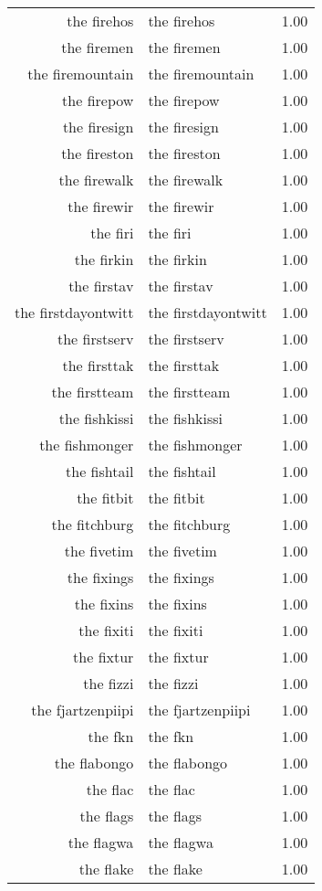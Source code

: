 \begin{table}[ht]
\begin{tabular}{rlr}
  the firehos & the firehos & 1.00 \\ 
  the firemen & the firemen & 1.00 \\ 
  the firemountain & the firemountain & 1.00 \\ 
  the firepow & the firepow & 1.00 \\ 
  the firesign & the firesign & 1.00 \\ 
  the fireston & the fireston & 1.00 \\ 
  the firewalk & the firewalk & 1.00 \\ 
  the firewir & the firewir & 1.00 \\ 
  the firi & the firi & 1.00 \\ 
  the firkin & the firkin & 1.00 \\ 
  the firstav & the firstav & 1.00 \\ 
  the firstdayontwitt & the firstdayontwitt & 1.00 \\ 
  the firstserv & the firstserv & 1.00 \\ 
  the firsttak & the firsttak & 1.00 \\ 
  the firstteam & the firstteam & 1.00 \\ 
  the fishkissi & the fishkissi & 1.00 \\ 
  the fishmonger & the fishmonger & 1.00 \\ 
  the fishtail & the fishtail & 1.00 \\ 
  the fitbit & the fitbit & 1.00 \\ 
  the fitchburg & the fitchburg & 1.00 \\ 
  the fivetim & the fivetim & 1.00 \\ 
  the fixings & the fixings & 1.00 \\ 
  the fixins & the fixins & 1.00 \\ 
  the fixiti & the fixiti & 1.00 \\ 
  the fixtur & the fixtur & 1.00 \\ 
  the fizzi & the fizzi & 1.00 \\ 
  the fjartzenpiipi & the fjartzenpiipi & 1.00 \\ 
  the fkn & the fkn & 1.00 \\ 
  the flabongo & the flabongo & 1.00 \\ 
  the flac & the flac & 1.00 \\ 
  the flags & the flags & 1.00 \\ 
  the flagwa & the flagwa & 1.00 \\ 
  the flake & the flake & 1.00 \\ 

\end{tabular}
\end{table}
